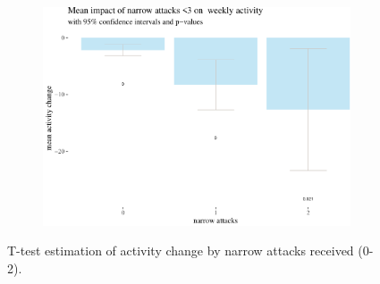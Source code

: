 \documentclass[10pt,]{scrartcl}
\begin{document}
\begin{figure}[h!]
\begin{subfigure}[t]{0.95\textwidth}

\begin{center}\includegraphics[width=1\linewidth]{redditAnalysisWalkthrough_files/figure-latex/unnamed-chunk-29-1} \end{center}
\end{subfigure}
\caption{T-test estimation of activity change by narrow attacks received (0-2).}
\label{fig:highbar3}
\end{figure}
\end{document}
